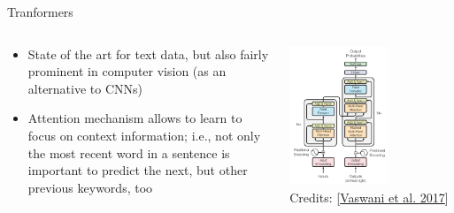 \documentclass[aspectratio=169]{../latex_main/tntbeamer}  %
\begin{document}
        \begin{frame}{Tranformers}

        \begin{columns}

        \begin{column}{0.5\textwidth}

            \begin{itemize}
                \item State of the art for text data, but also fairly prominent in computer vision (as an alternative to CNNs)
                \item Attention mechanism allows to learn to focus on context information; i.e., not only the most recent word in a sentence is important to predict the next, but other previous keywords, too
            \end{itemize}

        \end{column}

        \begin{column}{0.5\textwidth}

        \centering
        \vspace*{-2em}
        \includegraphics[width=0.6\textwidth]{figures/transformer.png}\\
        Credits: [\href{https://arxiv.org/pdf/1706.03762}{Vaswani et al. 2017}]

        \end{column}
            
        \end{columns}
        


        \end{frame}
\end{document}
